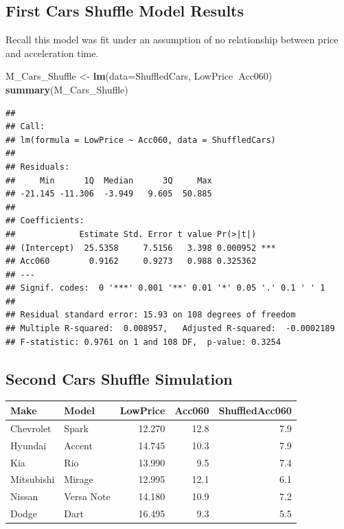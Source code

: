 \documentclass[]{book}
\newenvironment{Shaded}{\begin{snugshade}}{\end{snugshade}}
\newcommand{\KeywordTok}[1]{\textcolor[rgb]{0.13,0.29,0.53}{\textbf{#1}}}
\newcommand{\DataTypeTok}[1]{\textcolor[rgb]{0.13,0.29,0.53}{#1}}
\newcommand{\DecValTok}[1]{\textcolor[rgb]{0.00,0.00,0.81}{#1}}
\newcommand{\StringTok}[1]{\textcolor[rgb]{0.31,0.60,0.02}{#1}}
\newcommand{\OperatorTok}[1]{\textcolor[rgb]{0.81,0.36,0.00}{\textbf{#1}}}
\newcommand{\NormalTok}[1]{#1}
\begin{document}
\subsection{First Cars Shuffle Model
Results}\label{first-cars-shuffle-model-results}

Recall this model was fit under an assumption of no relationship between
price and acceleration time.

\begin{Shaded}
\begin{Highlighting}[]
\NormalTok{M_Cars_Shuffle <-}\StringTok{ }\KeywordTok{lm}\NormalTok{(}\DataTypeTok{data=}\NormalTok{ShuffledCars, LowPrice}\OperatorTok{~}\NormalTok{Acc060)}
\KeywordTok{summary}\NormalTok{(M_Cars_Shuffle)}
\end{Highlighting}
\end{Shaded}

\begin{verbatim}
## 
## Call:
## lm(formula = LowPrice ~ Acc060, data = ShuffledCars)
## 
## Residuals:
##     Min      1Q  Median      3Q     Max 
## -21.145 -11.306  -3.949   9.605  50.885 
## 
## Coefficients:
##             Estimate Std. Error t value Pr(>|t|)    
## (Intercept)  25.5358     7.5156   3.398 0.000952 ***
## Acc060        0.9162     0.9273   0.988 0.325362    
## ---
## Signif. codes:  0 '***' 0.001 '**' 0.01 '*' 0.05 '.' 0.1 ' ' 1
## 
## Residual standard error: 15.93 on 108 degrees of freedom
## Multiple R-squared:  0.008957,   Adjusted R-squared:  -0.0002189 
## F-statistic: 0.9761 on 1 and 108 DF,  p-value: 0.3254
\end{verbatim}

\subsection{Second Cars Shuffle
Simulation}\label{second-cars-shuffle-simulation}

\begin{Shaded}
\end{Shaded}

\begin{tabular}{l|l|r|r|r}
\hline
Make & Model & LowPrice & Acc060 & ShuffledAcc060\\
\hline
Chevrolet & Spark & 12.270 & 12.8 & 7.9\\
\hline
Hyundai & Accent & 14.745 & 10.3 & 7.9\\
\hline
Kia & Rio & 13.990 & 9.5 & 7.4\\
\hline
Mitsubishi & Mirage & 12.995 & 12.1 & 6.1\\
\hline
Nissan & Versa Note & 14.180 & 10.9 & 7.2\\
\hline
Dodge & Dart & 16.495 & 9.3 & 5.5\\
\hline
\end{tabular}
\end{document}
